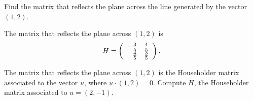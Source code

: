 \documentclass{ximera}
\begin{document}
\begin{exercise} \label{c7.9.4}
Find the matrix that reflects the plane across the line generated by the
vector $(1,2)$.

\begin{solution}

\ans The matrix that reflects the plane across $(1,2)$ is
\[
H = \left(\begin{array}{rr} -\frac{3}{5} & \frac{4}{5}\\ \frac{4}{5} &\frac{3}{5}\end{array}\right).
\]

\soln The matrix that reflects the plane across $(1,2)$ is the
Householder matrix associated to the vector $u$, where $u \cdot (1,2)
= 0$.  Compute $H$, the Householder matrix associated to $u = (2,-1)$.

\end{solution}
\end{exercise}
\end{document}
